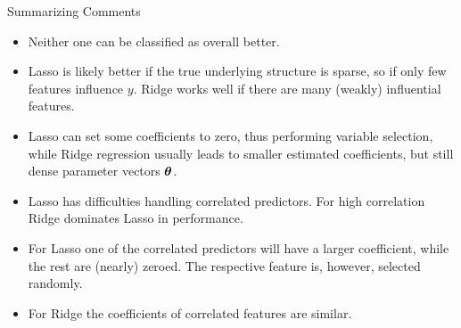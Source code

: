 \documentclass[11pt,compress,t,notes=noshow, xcolor=table]{beamer}
\begin{document}
\begin{vbframe}{Summarizing Comments}

\begin{itemize}
\item Neither one can be classified as overall better. 
\item Lasso is likely better if the true underlying structure is sparse, so if only few features influence $y$. Ridge works well if there are many (weakly) influential features.
\item Lasso can set some coefficients to zero, thus performing variable selection, while Ridge regression usually leads to smaller estimated coefficients, but still dense parameter vectors $\bm{\theta}$.
\item Lasso has difficulties handling correlated predictors. For high correlation Ridge dominates Lasso in performance.
\item For Lasso one of the correlated predictors will have a larger coefficient, while the rest are (nearly) zeroed. The respective feature is, however, selected randomly. 
\item For Ridge the coefficients of correlated features are similar.
\end{itemize}

\end{vbframe}

\endlecture
\end{document}
